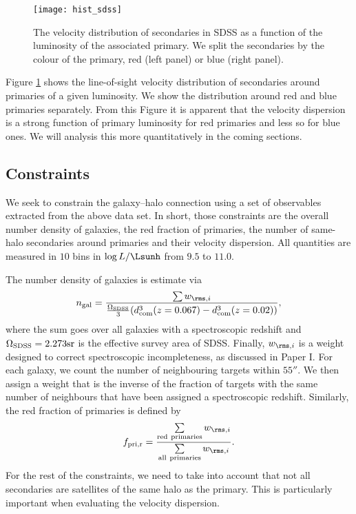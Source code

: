 \documentclass[fleqn,usenatbib,useAMS]{mnras}
\begin{document}
\begin{figure}
	\centering
	\texttt{[image: hist\_sdss]}
	\caption{The velocity distribution of secondaries in SDSS as a function of the luminosity of the associated primary. We split the secondaries by the colour of the primary, red (left panel) or blue (right panel).}
	\label{fig:hist}
\end{figure}

Figure \ref{fig:hist} shows the line-of-sight velocity distribution of secondaries around primaries of a given luminosity. We show the distribution around red and blue primaries separately. From this Figure it is apparent that the velocity dispersion is a strong function of primary luminosity for red primaries and less so for blue ones. We will analysis this more quantitatively in the coming sections.

\subsection{Constraints}

We seek to constrain the galaxy--halo connection using a set of observables extracted from the above data set. In short, those constraints are the overall number density of galaxies, the red fraction of primaries, the number of same-halo secondaries around primaries and their velocity dispersion. All quantities are measured in $10$ bins in $\log L / \Lsunh$ from $9.5$ to $11.0$.

The number density of galaxies is estimate via
\begin{equation}
	n_{\rm gal} = \frac{\sum w_{\rms, i}}{\frac{\Omega_{\rm SDSS}}{3} (d_{\rm com}^3 (z = 0.067) - d_{\rm com}^3 (z = 0.02))},
\end{equation}
where the sum goes over all galaxies with a spectroscopic redshift and $\Omega_{\rm SDSS} = 2.273 \mathrm{sr}$ is the effective survey area of SDSS. Finally, $w_{\rms, i}$ is a weight designed to correct spectroscopic incompleteness, as discussed in Paper I. For each galaxy, we count the number of neighbouring targets within $55''$. We then assign a weight that is the inverse of the fraction of targets with the same number of neighbours that have been assigned a spectroscopic redshift. Similarly, the red fraction of primaries is defined by
\begin{equation}
	f_{\rm pri, r} = \frac{\sum\limits_{\rm red \ primaries}w_{\rms, i}}{\sum\limits_{\rm all \ primaries} w_{\rms, i}}.
\end{equation}
For the rest of the constraints, we need to take into account that not all secondaries are satellites of the same halo as the primary. This is particularly important when evaluating the velocity dispersion.
\end{document}
